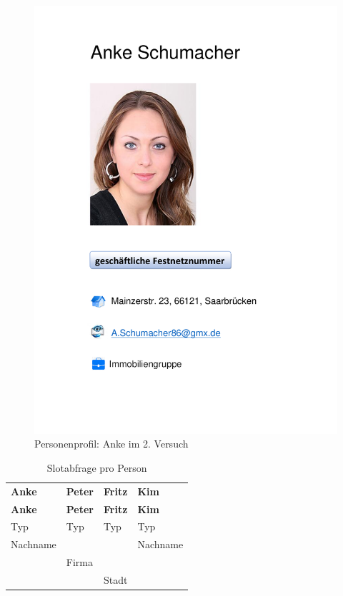 \documentclass[12pt,a4paper]{scrartcl}
\begin{document}
\begin{figure}[htbp]
\begin{center}
\includegraphics[width=12cm]{Anke2.pdf}
\caption{Personenprofil: Anke im 2. Versuch}
\label{anke2}
\end{center}
\end{figure}


\begin{longtable}{p{}p{}p{}p{}}
	\label{slotsPerson2}\\
	\caption[Slotabfrage pro Person]{Slotabfrage pro Person}\\
	\hline
	\textbf{Anke}&\textbf{Peter}&\textbf{Fritz} &\textbf{Kim}\\
	\hline
	\endfirsthead
	\hline
	\textbf{Anke}&\textbf{Peter}&\textbf{Fritz} &\textbf{Kim}\\
	\hline
	\endhead
Typ & Typ & Typ & Typ\\
Nachname & & & Nachname \\
& Firma & & \\
& & Stadt & \\

\hline
\end{longtable}
\end{document}
